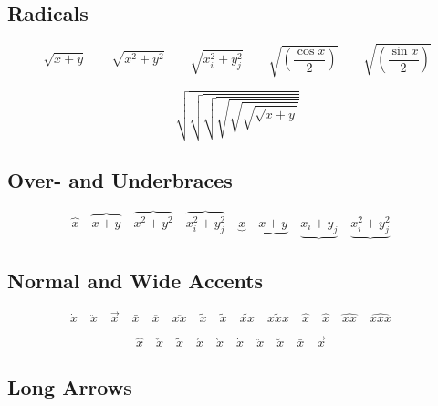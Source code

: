 \subsection{Radicals \showfamily}

\begin{displaymath}
  \sqrt{x+y} \qquad \sqrt{x^{2}+y^{2}} \qquad
  \sqrt{x_{i}^{2}+y_{j}^{2}} \qquad
  \sqrt{\left(\frac{\cos x}{2}\right)} \qquad
  \sqrt{\left(\frac{\sin x}{2}\right)}
\end{displaymath}

\begingroup
\delimitershortfall-1pt
\begin{displaymath}
  \sqrt{\sqrt{\sqrt{\sqrt{\sqrt{\sqrt{\sqrt{x+y}}}}}}}
\end{displaymath}
\endgroup %


\subsection{Over- and Underbraces \showfamily}

\begin{displaymath}
  \overbrace{x} \quad
  \overbrace{x+y} \quad
  \overbrace{x^{2}+y^{2}} \quad
  \overbrace{x_{i}^{2}+y_{j}^{2}} \quad
  \underbrace{x} \quad
  \underbrace{x+y} \quad
  \underbrace{x_{i}+y_{j}} \quad
  \underbrace{x_{i}^{2}+y_{j}^{2}} \quad
\end{displaymath}


\subsection{Normal and Wide Accents \showfamily}

\begin{displaymath}
  \dot{x} \quad
  \ddot{x} \quad
  \vec{x} \quad
  \bar{x} \quad
  \overline{x} \quad
  \overline{xx} \quad
  \tilde{x} \quad
  \widetilde{x} \quad
  \widetilde{xx} \quad
  \widetilde{xxx} \quad
  \hat{x} \quad
  \widehat{x} \quad
  \widehat{xx} \quad
  \widehat{xxx} \quad
\end{displaymath}

\begin{displaymath}
  \hat{x} \quad
  \check{x} \quad
  \tilde{x} \quad
  \acute{x} \quad
  \grave{x} \quad
  \dot{x} \quad
  \ddot{x} \quad
  \breve{x} \quad
  \bar{x} \quad
  \vec{x} \quad
\end{displaymath}


\subsection{Long Arrows \showfamily}

